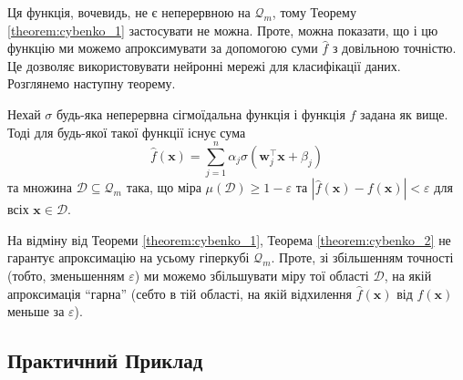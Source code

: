 Ця функція, вочевидь, не є неперервною на $\mathcal{Q}_m$, тому Теорему
\ref{theorem:cybenko_1} застосувати не можна. Проте, можна показати, що і цю
функцію ми можемо апроксимувати за допомогою суми $\hat{f}$ з довільною
точністю. Це дозволяє використовувати нейронні мережі для класифікації даних.
Розглянемо наступну теорему.
\begin{theorem}\label{theorem:cybenko_2}
    Нехай $\sigma$ будь-яка неперервна сігмоїдальна функція і функція
    $f$ задана як вище. Тоді для будь-якої такої функції існує сума
    \begin{equation*}
        \hat{f}(\mathbf{x}) = \sum_{j=1}^n \alpha_j \sigma(\boldsymbol{w}_j^{\top}\mathbf{x} + \beta_j)
    \end{equation*}
    та множина $\mathcal{D} \subseteq \mathcal{Q}_m$ така, що міра
    $\mu(\mathcal{D}) \geq 1-\varepsilon$ та $|\hat{f}(\mathbf{x}) -
    f(\mathbf{x})| < \varepsilon$ для всіх $\mathbf{x} \in \mathcal{D}$.
\end{theorem}

На відміну від Теореми \ref{theorem:cybenko_1}, Теорема \ref{theorem:cybenko_2}
не гарантує апроксимацію на усьому гіперкубі $\mathcal{Q}_m$. Проте, зі
збільшенням точності (тобто, зменьшенням $\varepsilon$) ми можемо збільшувати
міру тої області $\mathcal{D}$, на якій апроксимація ``гарна'' (себто в тій
області, на якій відхилення $\hat{f}(\mathbf{x})$ від $f(\mathbf{x})$ меньше за
$\varepsilon$).

\subsection{Практичний Приклад}

